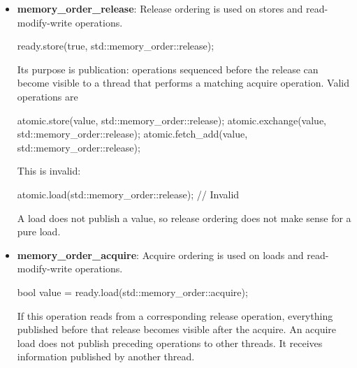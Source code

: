 \documentclass{report}
\begin{document}
\begin{itemize}
\begin{cppcode}
                // Thread 2
                if (ready.load(std::memory_order::relaxed)) {
                    std::cout << data;  // Data race: undefined behavior
                }
            \end{cppcode}
            \bigbreak \noindent 
            The atomic ready variable is safe, but nothing connects the ordinary write to data with the ordinary read from data.
        \item \textbf{memory\_order\_release}: Release ordering is used on stores and read-modify-write operations.
            \bigbreak \noindent 
            \begin{cppcode}
            ready.store(true, std::memory_order::release);
            \end{cppcode}
            \bigbreak \noindent 
            Its purpose is publication: operations sequenced before the release can become visible to a thread that performs a matching acquire operation.
            \bigbreak \noindent 
            Valid operations are 
            \bigbreak \noindent 
            \begin{cppcode}
                atomic.store(value, std::memory_order::release);
                atomic.exchange(value, std::memory_order::release);
                atomic.fetch_add(value, std::memory_order::release);
            \end{cppcode}
            \bigbreak \noindent 
            This is invalid:
            \bigbreak \noindent 
            \begin{cppcode}
            atomic.load(std::memory_order::release);  // Invalid
            \end{cppcode}
            \bigbreak \noindent 
            A load does not publish a value, so release ordering does not make sense for a pure load.
        \item \textbf{memory\_order\_acquire}: Acquire ordering is used on loads and read-modify-write operations.
            \bigbreak \noindent 
            \begin{cppcode}
            bool value = ready.load(std::memory_order::acquire);
            \end{cppcode}
            \bigbreak \noindent 
            If this operation reads from a corresponding release operation, everything published before that release becomes visible after the acquire.
            \bigbreak \noindent 
            An acquire load does not publish preceding operations to other threads. It receives information published by another thread.
            \bigbreak \noindent 

\end{itemize}
\end{document}
